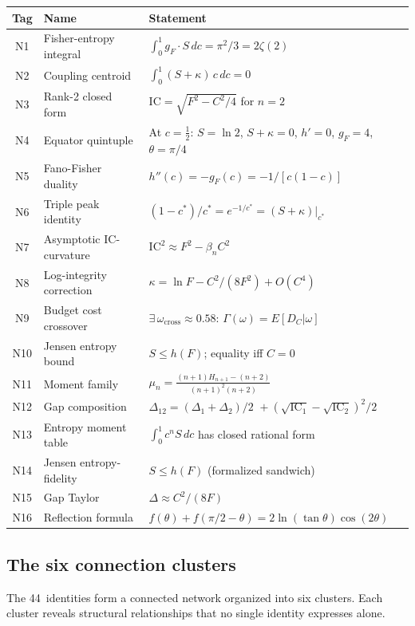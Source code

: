 \documentclass[
  aps,
  prd,
  twocolumn,
  superscriptaddress,
  nofootinbib,
  floatfix
]{revtex4-2}
\newcommand{\Gam}{\Gamma}
\newcommand{\IC}{\mathrm{IC}}
\newcommand{\gF}{g_{\!F}}
\begin{document}
{\small
\begin{center}
\begin{tabular}{@{}clP{3.5cm}@{}}
\toprule
Tag & Name & Statement \\
\midrule
N1 & Fisher-entropy integral &
  $\int_0^1 \gF \cdot S\,dc = \pi^2/3 = 2\zeta(2)$ \\
N2 & Coupling centroid &
  $\int_0^1 (S{+}\kappa)\,c\,dc = 0$ \\
N3 & Rank-2 closed form &
  $\IC = \sqrt{F^2 - C^2/4}$ for $n = 2$ \\
N4 & Equator quintuple &
  At $c = \tfrac{1}{2}$: $S = \ln 2$, $S{+}\kappa = 0$,
  $h' = 0$, $\gF = 4$, $\theta = \pi/4$ \\
N5 & Fano-Fisher duality &
  $h''(c) = -\gF(c) = -1/[c(1{-}c)]$ \\
N6 & Triple peak identity &
  $(1{-}c^*)/c^* = e^{-1/c^*} = (S{+}\kappa)|_{c^*}$ \\
N7 & Asymptotic IC-curvature &
  $\IC^2 \approx F^2 - \beta_n C^2$ \\
N8 & Log-integrity correction &
  $\kappa = \ln F - C^2/(8F^2) + O(C^4)$ \\
N9 & Budget cost crossover &
  $\exists\,\omega_\mathrm{cross} \approx 0.58$:
  $\Gam(\omega) = E[D_C|\omega]$ \\
N10 & Jensen entropy bound &
  $S \leq h(F)$; equality iff $C = 0$ \\
N11 & Moment family &
  $\mu_n =
  \frac{(n{+}1)H_{n{+}1}{-}(n{+}2)}{(n{+}1)^2(n{+}2)}$ \\
N12 & Gap composition &
  $\Delta_{12} = (\Delta_1{+}\Delta_2)/2$
  ${} + (\sqrt{\IC_1}{-}\sqrt{\IC_2})^2\!/2$ \\
N13 & Entropy moment table &
  $\int_0^1 c^n S\,dc$ has closed rational form \\
N14 & Jensen entropy-fidelity &
  $S \leq h(F)$ (formalized sandwich) \\
N15 & Gap Taylor &
  $\Delta \approx C^2/(8F)$ \\
N16 & Reflection formula &
  $f(\theta) + f(\pi/2{-}\theta)
  = 2\ln(\tan\theta)\cos(2\theta)$ \\
\bottomrule
\end{tabular}
\end{center}}

\subsection{The six connection clusters}

The 44~identities form a connected network organized into
six clusters.  Each cluster reveals structural relationships
that no single identity expresses alone.
\end{document}

